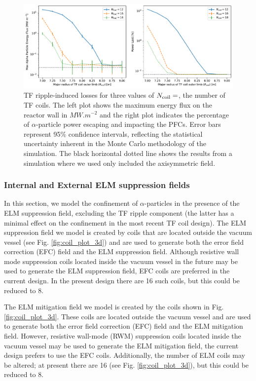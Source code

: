 \documentclass[10pt, a4paper, twoside]{article}
\begin{document}
\begin{figure}[!htb]
    \centering
    \includegraphics[width=0.99\linewidth]{Figures/max_and_total_flux_vs_rcoil_and_ncoil.pdf}
    \caption{TF ripple-induced losses for three values of $N_{\rm coil}=$, the number of TF coils. The left plot shows the maximum energy flux on the reactor wall in $\si{MW.m^{-2}}$ and the right plot indicates the percentage of $\alpha$-particle power escaping and impacting the PFCs. Error bars represent 95\% confidence intervals, reflecting the statistical uncertainty inherent in the Monte Carlo methodology of the simulation. The black horizontal dotted line shows the results from a simulation where we used only included the axisymmetric field.}
    \label{fig:max_and_total_flux_vs_rcoil_and_ncoil}
\end{figure}

\subsubsection{Internal and External ELM suppression fields}
\label{sec:elm_suppression_field}

In this section, we model the confinement of $\alpha$-particles in the presence of the ELM suppression field, excluding the TF ripple component (the latter has a minimal effect on the confinement in the most recent TF coil design). The ELM suppression field we model is created by coils that are located outside the vacuum vessel (see Fig. \ref{fig:coil_plot_3d}) and are used to generate both the error field correction (EFC) field and the ELM suppression field. Although resistive wall mode suppression coils located inside the vacuum vessel in the future may be used to generate the ELM suppression field, EFC coils are preferred in the current design. In the present design there are 16 such coils, but this could be reduced to 8.

The ELM mitigation field we model is created by the coils shown in Fig. \ref{fig:coil_plot_3d}. These coils are located outside the vacuum vessel and are used to generate both the error field correction (EFC) field and the ELM mitigation field. However, resistive wall-mode (RWM) suppression coils located inside the vacuum vessel may be used to generate the ELM mitigation field, the current design prefers to use the EFC coils. Additionally, the number of ELM coils may be altered; at present there are 16 (see Fig. \ref{fig:coil_plot_3d}), but this could be reduced to 8.
\end{document}
